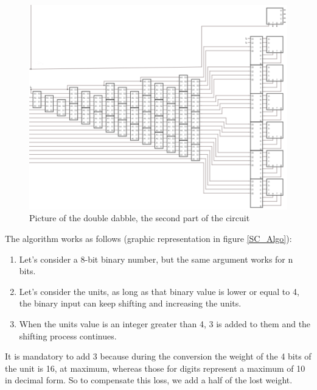 \documentclass{article}
\begin{document}
\begin{figure}[h]
    \centering
    \includegraphics[scale=0.43]{SC_DoubleDabble}
    \caption{Picture of the double dabble, the second part of the circuit}
    \label{DoubleDabble}
  \end{figure}


The algorithm works as follows (graphic representation in figure \ref{SC_Algo}):
\begin{enumerate}
  \item Let's consider a 8-bit binary number, but the same argument works for n bits. 
  \item Let's consider the units, as long as that binary value is lower or equal to 4, the binary input can keep shifting and increasing the units.
  \item When the units value is an integer greater than 4, 3 is added to them and the shifting process continues.
\end{enumerate}

It is mandatory to add 3 because during the conversion the weight of the 4 bits of the unit is 16, at maximum, whereas those for digits represent a maximum of 10 in decimal form. So to compensate this loss, we add a half of the lost weight.
\end{document}
